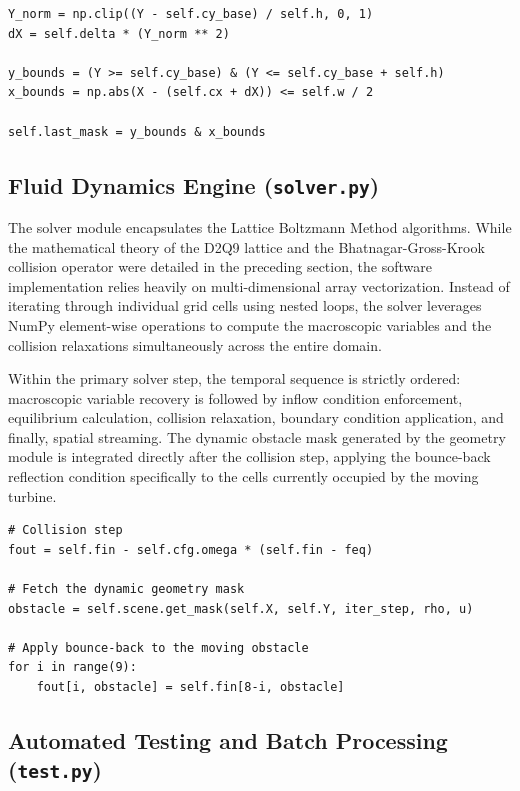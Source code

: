 \documentclass[11pt,a4paper]{article}
\begin{document}
\begin{lstlisting}[style=pystyle]
Y_norm = np.clip((Y - self.cy_base) / self.h, 0, 1)
dX = self.delta * (Y_norm ** 2)

y_bounds = (Y >= self.cy_base) & (Y <= self.cy_base + self.h)
x_bounds = np.abs(X - (self.cx + dX)) <= self.w / 2

self.last_mask = y_bounds & x_bounds
\end{lstlisting}

\subsection{Fluid Dynamics Engine (\texttt{solver.py})}
The solver module encapsulates the Lattice Boltzmann Method algorithms. While the mathematical theory of the D2Q9 lattice and the Bhatnagar-Gross-Krook collision operator were detailed in the preceding section, the software implementation relies heavily on multi-dimensional array vectorization. Instead of iterating through individual grid cells using nested loops, the solver leverages NumPy element-wise operations to compute the macroscopic variables and the collision relaxations simultaneously across the entire domain.

Within the primary solver step, the temporal sequence is strictly ordered: macroscopic variable recovery is followed by inflow condition enforcement, equilibrium calculation, collision relaxation, boundary condition application, and finally, spatial streaming. The dynamic obstacle mask generated by the geometry module is integrated directly after the collision step, applying the bounce-back reflection condition specifically to the cells currently occupied by the moving turbine.

\begin{lstlisting}[style=pystyle]
# Collision step
fout = self.fin - self.cfg.omega * (self.fin - feq)

# Fetch the dynamic geometry mask
obstacle = self.scene.get_mask(self.X, self.Y, iter_step, rho, u)

# Apply bounce-back to the moving obstacle
for i in range(9):
    fout[i, obstacle] = self.fin[8-i, obstacle]
\end{lstlisting}

\subsection{Automated Testing and Batch Processing (\texttt{test.py})}
\end{document}
